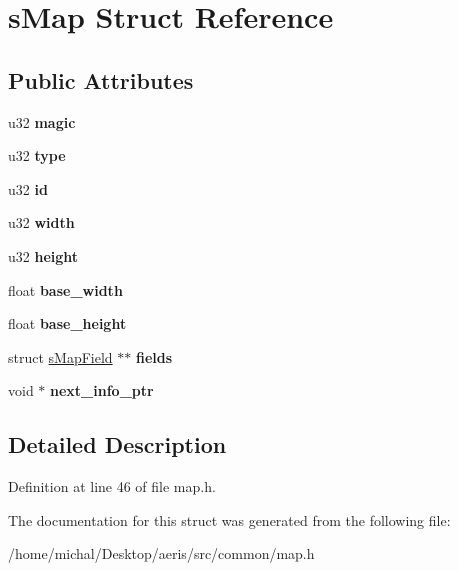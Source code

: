 \hypertarget{structsMap}{\section{s\-Map Struct Reference}
\label{structsMap}
}
\subsection*{Public Attributes}
\begin{DoxyCompactItemize}
\item 
\hypertarget{structsMap_a888fdd62c59aabd2acc042248f479ae5}{u32 {\bfseries magic}}\label{structsMap_a888fdd62c59aabd2acc042248f479ae5}

\item 
\hypertarget{structsMap_a699a06fb8a2cc41b06b06990c46488b3}{u32 {\bfseries type}}\label{structsMap_a699a06fb8a2cc41b06b06990c46488b3}

\item 
\hypertarget{structsMap_a04d056c46d281e64050a0bdf088e5306}{u32 {\bfseries id}}\label{structsMap_a04d056c46d281e64050a0bdf088e5306}

\item 
\hypertarget{structsMap_aad556c1771189cc0cf2a8fcb5807f7c0}{u32 {\bfseries width}}\label{structsMap_aad556c1771189cc0cf2a8fcb5807f7c0}

\item 
\hypertarget{structsMap_a91ad86a4b60aff6e96ead62f85bbb2df}{u32 {\bfseries height}}\label{structsMap_a91ad86a4b60aff6e96ead62f85bbb2df}

\item 
\hypertarget{structsMap_a1580fef54a11716cccf3aeec0e160158}{float {\bfseries base\-\_\-width}}\label{structsMap_a1580fef54a11716cccf3aeec0e160158}

\item 
\hypertarget{structsMap_a17a619b4cd27500646120fe430abf8af}{float {\bfseries base\-\_\-height}}\label{structsMap_a17a619b4cd27500646120fe430abf8af}

\item 
\hypertarget{structsMap_ab95fdcca6c5ff181dd89d1cacaa337d3}{struct \hyperlink{structsMapField}{s\-Map\-Field} $\ast$$\ast$ {\bfseries fields}}\label{structsMap_ab95fdcca6c5ff181dd89d1cacaa337d3}

\item 
\hypertarget{structsMap_a192a32e60d412fc6940a016fe22f6d9c}{void $\ast$ {\bfseries next\-\_\-info\-\_\-ptr}}\label{structsMap_a192a32e60d412fc6940a016fe22f6d9c}

\end{DoxyCompactItemize}


\subsection{Detailed Description}


Definition at line 46 of file map.\-h.



The documentation for this struct was generated from the following file\-:\begin{DoxyCompactItemize}
\item 
/home/michal/\-Desktop/aeris/src/common/map.\-h\end{DoxyCompactItemize}
